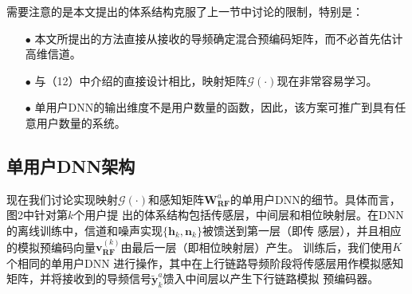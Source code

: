 \documentclass[10pt,journal,final]{IEEEtran}%
\begin{document}
需要注意的是本文提出的体系结构克服了上一节中讨论的限制，特别是：
\begin{itemize}
    \item[$\bullet $]
    本文所提出的方法直接从接收的导频确定混合预编码矩阵，而不必首先估计高维信道。
    \item[$\bullet $]
    与（12）中介绍的直接设计相比，映射矩阵$\mathcal{G}(\cdot)$现在非常容易学习。 
    \item[$\bullet $] 
    单用户DNN的输出维度不是用户数量的函数，因此，该方案可推广到具有任意用户数量的系统。 
\end{itemize}
\vspace{-1.8em}
\subsection{单用户DNN架构}
\vspace{0.2em}
现在我们讨论实现映射$\mathcal{G}(\cdot)$和感知矩阵$\mathbf{W}_{\mathbf{RF}}^{a}$的单用户DNN的细节。具体而言，图2中针对第$k$个用户提
出的体系结构包括传感层，中间层和相位映射层。在DNN的离线训练中，信道和噪声实现$\{\mathbf{h}_{k},\mathbf{n}_{k}\}$被馈送到第一层（即传
感层），并且相应的模拟预编码向量$\mathbf{v}_{\mathbf{RF}}^{(k)}$由最后一层（即相位映射层）产生。 训练后，我们使用$K$个相同的单用户DNN
进行操作，其中在上行链路导频阶段将传感层用作模拟感知矩阵，并将接收到的导频信号$\tilde{\mathbf{y}}_{k}^{a}$馈入中间层以产生下行链路模拟
预编码器。
\end{document}

